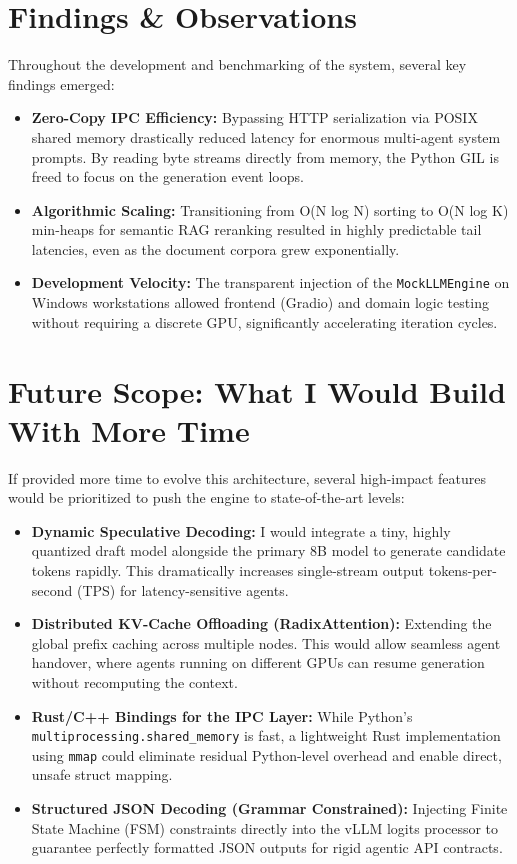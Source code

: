 \documentclass[10pt,twocolumn,letterpaper]{article}
\begin{document}
\section{Findings \& Observations}
Throughout the development and benchmarking of the system, several key findings emerged:
\begin{itemize}
    \item \textbf{Zero-Copy IPC Efficiency:} Bypassing HTTP serialization via POSIX shared memory drastically reduced latency for enormous multi-agent system prompts. By reading byte streams directly from memory, the Python GIL is freed to focus on the generation event loops.
    \item \textbf{Algorithmic Scaling:} Transitioning from O(N log N) sorting to O(N log K) min-heaps for semantic RAG reranking resulted in highly predictable tail latencies, even as the document corpora grew exponentially.
    \item \textbf{Development Velocity:} The transparent injection of the \texttt{MockLLMEngine} on Windows workstations allowed frontend (Gradio) and domain logic testing without requiring a discrete GPU, significantly accelerating iteration cycles.
\end{itemize}

\section{Future Scope: What I Would Build With More Time}
If provided more time to evolve this architecture, several high-impact features would be prioritized to push the engine to state-of-the-art levels:

\begin{itemize}
    \item \textbf{Dynamic Speculative Decoding:} I would integrate a tiny, highly quantized draft model alongside the primary 8B model to generate candidate tokens rapidly. This dramatically increases single-stream output tokens-per-second (TPS) for latency-sensitive agents.
    \item \textbf{Distributed KV-Cache Offloading (RadixAttention):} Extending the global prefix caching across multiple nodes. This would allow seamless agent handover, where agents running on different GPUs can resume generation without recomputing the context.
    \item \textbf{Rust/C++ Bindings for the IPC Layer:} While Python's \texttt{multiprocessing.shared\_memory} is fast, a lightweight Rust implementation using \texttt{mmap} could eliminate residual Python-level overhead and enable direct, unsafe struct mapping.
    \item \textbf{Structured JSON Decoding (Grammar Constrained):} Injecting Finite State Machine (FSM) constraints directly into the vLLM logits processor to guarantee perfectly formatted JSON outputs for rigid agentic API contracts.
\end{itemize}
\end{document}
